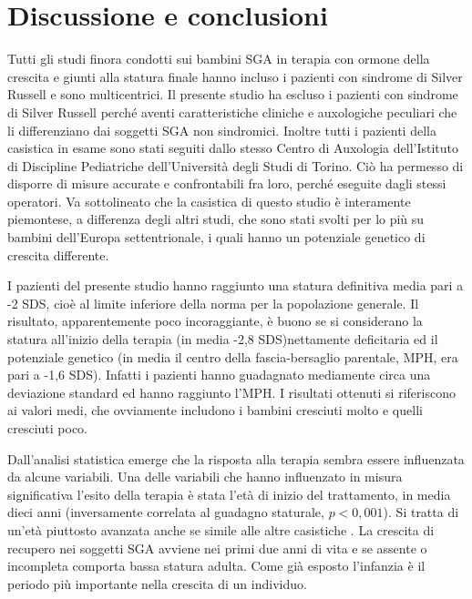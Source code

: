 \chapter{Discussione e conclusioni}


Tutti gli studi finora condotti sui bambini SGA in terapia con ormone della crescita e giunti alla statura finale hanno incluso i pazienti con sindrome di Silver Russell e sono multicentrici. Il presente studio ha escluso i pazienti con sindrome di Silver Russell perché aventi caratteristiche cliniche e auxologiche peculiari che li differenziano dai soggetti SGA non sindromici. Inoltre tutti i pazienti della casistica in esame sono stati seguiti dallo stesso Centro di Auxologia dell'Istituto di Discipline Pediatriche dell'Università degli Studi di Torino. Ciò ha permesso di disporre di misure accurate e confrontabili fra loro, perché eseguite dagli stessi operatori. Va sottolineato che la casistica di questo studio è interamente piemontese, a differenza degli altri studi, che sono stati svolti per lo più su bambini dell'Europa settentrionale, i quali hanno un potenziale genetico di crescita differente.

I pazienti del presente studio hanno raggiunto una statura definitiva media pari a -2 SDS, cioè al limite inferiore della norma per la popolazione generale. Il risultato, apparentemente poco incoraggiante, è buono se si considerano la statura all'inizio della terapia (in media -2,8 SDS)nettamente deficitaria ed il potenziale genetico (in media il centro della fascia-bersaglio parentale, MPH, era pari a -1,6 SDS). Infatti i pazienti hanno guadagnato mediamente circa una deviazione standard ed hanno raggiunto l'MPH. I risultati ottenuti si riferiscono ai valori medi, che ovviamente includono i bambini cresciuti molto e quelli cresciuti poco. 

Dall'analisi statistica emerge che la risposta alla terapia sembra essere influenzata da alcune variabili.
Una delle variabili che hanno influenzato in misura significativa l'esito della terapia è stata l'età di inizio del trattamento, in media dieci anni (inversamente correlata al guadagno staturale, $p < 0,001$). Si tratta di un'età piuttosto avanzata anche se simile alle altre casistiche\cite{coutant1998short} \cite{zucchini2001final}. La crescita di recupero nei soggetti SGA avviene nei primi due anni di vita e se assente o incompleta comporta bassa statura adulta. Come già esposto l'infanzia è il periodo più importante nella crescita di un individuo. 

